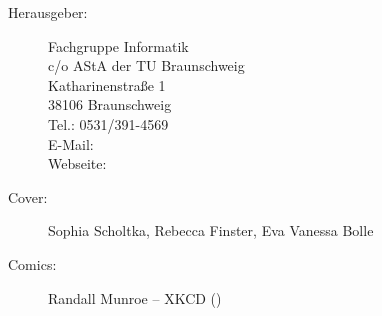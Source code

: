 
\begin{description}
\item[Herausgeber:]
	Fachgruppe Informatik\\
	c/o AStA der TU Braunschweig\\
	Katharinenstraße 1\\
	38106 Braunschweig\\
	Tel.: 0531/391-4569\\
	E-Mail: \\
	Webseite: \fginfoUrl
{}
\item[Cover:] Sophia Scholtka, Rebecca Finster, Eva Vanessa Bolle

\item[Comics:] Randall Munroe -- XKCD ()
\end{description}
